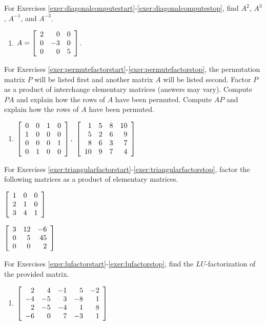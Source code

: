 \noindent For Exercises \ref{exer:diagonalcomputestart}-\ref{exer:diagonalcomputestop}, find $A^2$, $A^3$, $A^{-1}$, and $A^{-3}$.
\begin{enumerate}[!HW!, label=$\spadesuit$ \arabic*., ref=\arabic*]
\item\label{exer:diagonalcomputestart}\label{exer:diagonalcomputestop}  $A= \mtx{rrr}{2&0&0\\0&-3&0\\0&0&5}$. %
\end{enumerate}

\noindent For Exercises \ref{exer:permutefactorstart}-\ref{exer:permutefactorstop}, the permutation matrix $P$ will be listed first and another matrix $A$ will be listed second. Factor $P$ as a product of interchange elementary matrices (answers may vary). Compute $PA$ and explain how the rows of $A$ have been permuted. Compute $AP$ and explain how the rows of $A$ have been permuted.
\begin{enumerate}[!HW!]
\item\label{exer:permutefactorstart}\label{exer:permutefactorstop} $\mtx{rrrr}{0&0&1&0\\1&0&0&0\\0&0&0&1\\0&1&0&0},\ \mtx{rrrr}{1&5&8&10\\5&2&6&9\\8&6&3&7\\10&9&7&4}$ %
\end{enumerate}

\noindent For Exercises \ref{exer:triangularfactorstart}-\ref{exer:triangularfactorstop}, factor the following matrices as a product of elementary matrices. %
\begin{enumerate}[!HW!, label=$\spadesuit$ \arabic*., ref=\arabic*]
\begin{multicols}{2}
\item\label{exer:triangularfactorstart} $\mtx{rrr}{1&0&0\\2&1&0\\3&4&1}$
\item\label{exer:triangularfactorstop} $\mtx{rrr}{3&12&-6\\0&5&45\\0&0&2}$ 
\end{multicols}
\end{enumerate}

\noindent For Exercises \ref{exer:lufactorstart}-\ref{exer:lufactorstop}, find the $LU$-factorization of the provided matrix.
\begin{enumerate}[!HW!]
\item\label{exer:lufactorstart}\label{exer:lufactorstop} $\mtx{rrrrr}{2&4&-1&5&-2\\-4&-5&3&-8&1\\2&-5&-4&1&8\\-6&0&7&-3&1}$ %
\end{enumerate}

